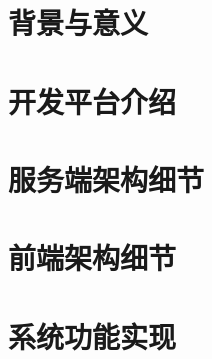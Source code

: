 \documentclass[12pt,a4paper]{article}
\begin{document}
\begin{CJK*}{UTF8}{gbsn}

\renewcommand{\abstractname}{摘要}
\newcommand{\HRule}{\rule{\linewidth}{0.5mm}}
\setcounter{tocdepth}{3}



\begin{spacing}{2.0}
\begin{abstract}
	
\end{abstract}
\end{spacing}

\begin{spacing}{2.0}
	\tableofcontents\clearpage
\end{spacing}

\begin{spacing}{1.8}
\section{背景与意义}


\section{开发平台介绍}


\section{服务端架构细节}


\section{前端架构细节}


\section{系统功能实现}


% 

% 


\end{spacing}
\end{CJK*}
\end{document}
